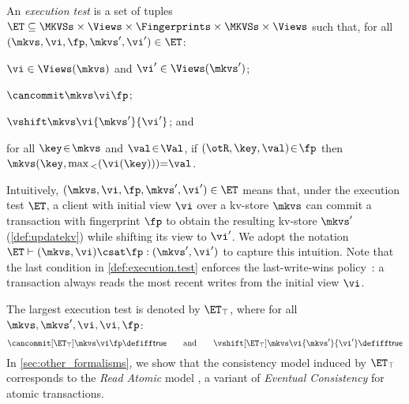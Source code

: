 \begin{definition}
\label{def:execution.test}
An \emph{execution test} is a set of tuples $\ET \subseteq \MKVSs \times \Views \times \Fingerprints \times \MKVSs \times \Views$ 
such that, for all $(\mkvs, \vi, \fp, \mkvs', \vi') \in \ET$: 
\begin{enumerate*}
	\item $\vi \in \Views(\mkvs)$ and $\vi' \in \Views(\mkvs')$; 
	\item $\cancommit \mkvs \vi \fp$; 
	\item $\vshift \mkvs \vi {\mkvs'} {\vi'}$; and 
	\item for all $\key \!\in\! \mkvs$ and $\val \!\in\! \Val$, if $(\otR, \key, \val) \!\in\! \fp $ then $	\mkvs(\key, \max{}_{<}(\vi(\key))) {=} \val   $.
\end{enumerate*}



\end{definition}
%
\noindent 
Intuitively, $(\mkvs, \vi, \fp, \mkvs', \vi') \in \ET$ means that, under the execution test $\ET$,
a client with initial view $\vi$ over a kv-store $\mkvs$ can commit a transaction with 
fingerprint $\fp$ to obtain the resulting kv-store $\mkvs'$ (\cref{def:updatekv}) while shifting its view
to $\vi'$. We adopt the 
notation $\ET \vdash (\mkvs, \vi) \csat \fp: (\mkvs', \vi')$  to
capture this intuition. 
Note that the last condition in \cref{def:execution.test} enforces the last-write-wins
policy~\cite{vogels:2009:ec:1435417.1435432}: 
a transaction always reads the most recent writes from the initial view \(\vi\).  

The largest execution test is denoted by $\ET_{\top}$, where for all $\mkvs, \mkvs', \vi, \vi, \fp$: 
\[
	\cancommit[\ET_{\top}] \mkvs \vi \fp \defiff \mathsf{true}
	\qquad  \text{and} \qquad 
	\vshift[\ET_{\top}] \mkvs \vi {\mkvs'} {\vi'} \defiff \mathsf{true}
\] 
In \cref{sec:other_formalisms}, we show that the consistency model induced by $\ET_{\top}$ 
corresponds to the \emph{Read Atomic} model \cite{ramp}, a variant of \emph{Eventual 
Consistency} \cite{ev_transactions} for atomic transactions. 

